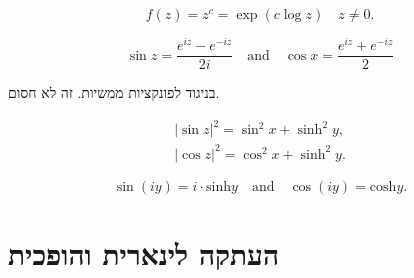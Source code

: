 \documentclass{tstextbook}
\begin{document}
\begin{definition}
$$f(z)=z^{c}=\exp(c\log z)\quad z\neq0.$$

\end{definition}
\begin{definition}
$$\sin z={\frac{e^{i z}-e^{-i z}}{2i}}\quad{\mathrm{and}}\quad\cos x={\frac{e^{i z}+e^{-i z}}{2}}$$

\end{definition}
בניגוד לפונקציות ממשיות. זה לא חסום.

\begin{proposition}
$$\begin{array}{l}{{|\sin z|^{2}=\sin^{2}x+\sinh^{2}y,}}\\ {{|\cos z|^{2}=\cos^{2}x+\sinh^{2}y.}}\end{array}$$

\end{proposition}
\begin{proposition}
$$\sin(i y)=i\cdot\mathrm{sinh}y\quad\mathrm{and}\quad\cos(i y)=\mathrm{cosh}y.$$

\end{proposition}
\section{העתקה לינארית והופכית}
\end{document}
